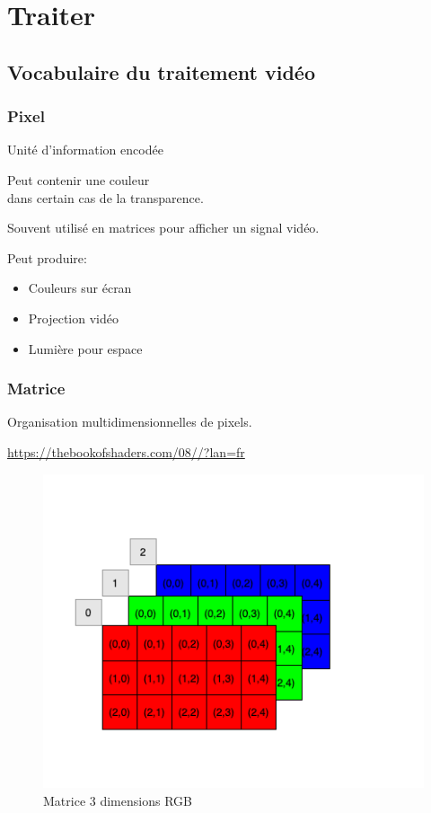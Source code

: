 \documentclass[
  french,
]{book}
\providecommand{\tightlist}{%
  \setlength{\itemsep}{0pt}\setlength{\parskip}{0pt}}
\begin{document}
\hypertarget{traiter}{%
\chapter{Traiter}\label{traiter}}

\hypertarget{vocabulaire-du-traitement-viduxe9o}{%
\section{Vocabulaire du traitement vidéo}\label{vocabulaire-du-traitement-viduxe9o}}

\hypertarget{pixel}{%
\subsection{Pixel}\label{pixel}}

Unité d'information encodée

Peut contenir une couleur\\
dans certain cas de la transparence.

Souvent utilisé en matrices pour afficher un signal vidéo.

Peut produire:

\begin{itemize}
\tightlist
\item
  Couleurs sur écran
\item
  Projection vidéo
\item
  Lumière pour espace
\end{itemize}

\hypertarget{matrice}{%
\subsection{Matrice}\label{matrice}}

Organisation multidimensionnelles de pixels.

\url{https://thebookofshaders.com/08//?lan=fr}

\begin{figure}
\centering
\includegraphics{medias/traiter/figures/dia_matrice_RGB.png}
\caption{Matrice 3 dimensions RGB}
\end{figure}
\end{document}
